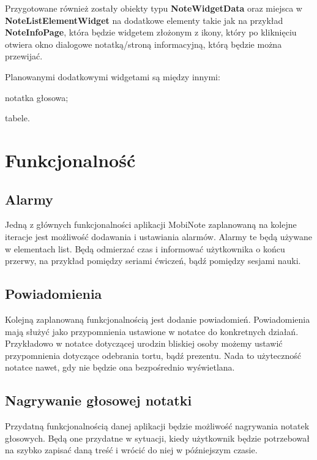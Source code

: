 Przygotowane również zostały obiekty typu \textbf{NoteWidgetData} oraz miejsca w \textbf{NoteListElementWidget} na dodatkowe elementy takie jak na przykład \textbf{NoteInfoPage}, która będzie widgetem złożonym z ikony, który po kliknięciu otwiera okno dialogowe notatką/stroną informacyjną, którą będzie można przewijać.

Planowanymi dodatkowymi widgetami są między innymi:

\begin{compactitem}
    \item notatka głosowa;
    \item tabele.
\end{compactitem}

\section{Funkcjonalność}

\subsection{Alarmy}

Jedną z głównych funkcjonalności aplikacji MobiNote zaplanowaną na kolejne iteracje jest możliwość dodawania i ustawiania alarmów. Alarmy te będą używane w elementach list. Będą odmierzać czas i informować użytkownika o końcu przerwy, na przykład pomiędzy seriami ćwiczeń, bądź pomiędzy sesjami nauki.

\subsection{Powiadomienia}

Kolejną zaplanowaną funkcjonalnością jest dodanie powiadomień. Powiadomienia mają służyć jako przypomnienia ustawione w notatce do konkretnych działań. Przykładowo w notatce dotyczącej urodzin bliskiej osoby możemy ustawić przypomnienia dotyczące odebrania tortu, bądź prezentu. Nada to użyteczność notatce nawet, gdy nie będzie ona bezpośrednio wyświetlana.

\subsection{Nagrywanie głosowej notatki}

Przydatną funkcjonalnością danej aplikacji będzie możliwość nagrywania notatek głosowych. Będą one przydatne w sytuacji, kiedy użytkownik będzie potrzebował na szybko zapisać daną treść i wrócić do niej w późniejszym czasie.

